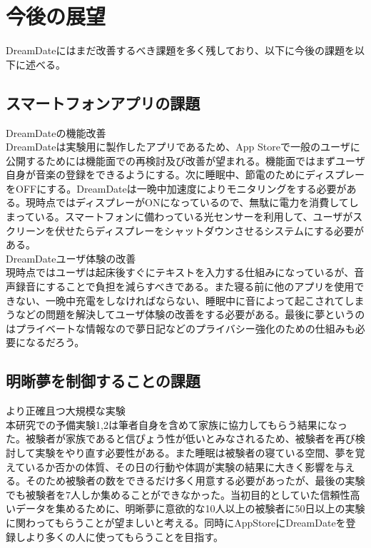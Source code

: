 \section{今後の展望}
DreamDateにはまだ改善するべき課題を多く残しており、以下に今後の課題を以下に述べる。

\subsection{スマートフォンアプリの課題}
DreamDateの機能改善\\
DreamDateは実験用に製作したアプリであるため、App Storeで一般のユーザに公開するためには機能面での再検討及び改善が望まれる。機能面ではまずユーザ自身が音楽の登録をできるようにする。次に睡眠中、節電のためにディスプレーをOFFにする。DreamDateは一晩中加速度によりモニタリングをする必要がある。現時点ではディスプレーがONになっているので、無駄に電力を消費してしまっている。スマートフォンに備わっている光センサーを利用して、ユーザがスクリーンを伏せたらディスプレーをシャットダウンさせるシステムにする必要がある。\\

DreamDateユーザ体験の改善\\
現時点ではユーザは起床後すぐにテキストを入力する仕組みになっているが、音声録音にすることで負担を減らすべきである。また寝る前に他のアプリを使用できない、一晩中充電をしなければならない、睡眠中に音によって起こされてしまうなどの問題を解決してユーザ体験の改善をする必要がある。最後に夢というのはプライベートな情報なので夢日記などのプライバシー強化のための仕組みも必要になるだろう。\\

\subsection{明晰夢を制御することの課題}
より正確且つ大規模な実験\\
本研究での予備実験1,2は筆者自身を含めて家族に協力してもらう結果になった。被験者が家族であると信ぴょう性が低いとみなされるため、被験者を再び検討して実験をやり直す必要性がある。また睡眠は被験者の寝ている空間、夢を覚えているか否かの体質、その日の行動や体調が実験の結果に大きく影響を与える。そのため被験者の数をできるだけ多く用意する必要があったが、最後の実験でも被験者を7人しか集めることができなかった。当初目的としていた信頼性高いデータを集めるために、明晰夢に意欲的な10人以上の被験者に50日以上の実験に関わってもらうことが望ましいと考える。同時にAppStoreにDreamDateを登録しより多くの人に使ってもらうことを目指す。\\

